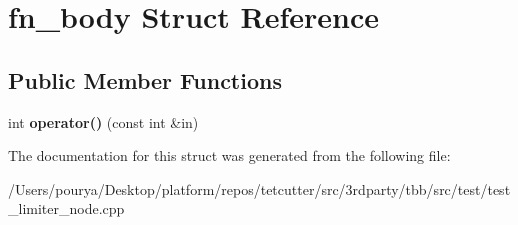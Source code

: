 \hypertarget{structfn__body}{}\section{fn\+\_\+body Struct Reference}
\label{structfn__body}
\subsection*{Public Member Functions}
\begin{DoxyCompactItemize}
\item 
\hypertarget{structfn__body_a46eb34ee89893821f1800fb177d308c2}{}int {\bfseries operator()} (const int \&in)\label{structfn__body_a46eb34ee89893821f1800fb177d308c2}

\end{DoxyCompactItemize}


The documentation for this struct was generated from the following file\+:\begin{DoxyCompactItemize}
\item 
/\+Users/pourya/\+Desktop/platform/repos/tetcutter/src/3rdparty/tbb/src/test/test\+\_\+limiter\+\_\+node.\+cpp\end{DoxyCompactItemize}
